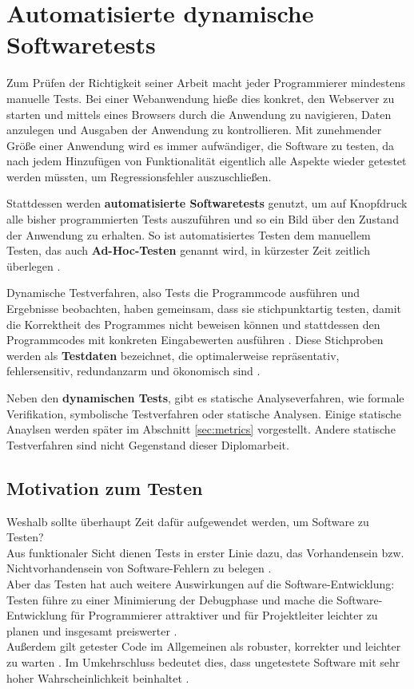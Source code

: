 \chapter{Automatisierte dynamische Softwaretests}
\label{sec:test}
Zum Prüfen der Richtigkeit seiner Arbeit macht jeder Programmierer mindestens manuelle Tests. Bei einer Webanwendung hieße dies konkret, den Webserver zu starten und mittels eines Browsers durch die Anwendung zu navigieren, Daten anzulegen und Ausgaben der Anwendung zu kontrollieren. Mit zunehmender Größe einer Anwendung wird es immer aufwändiger, die Software zu testen, da nach jedem Hinzufügen von Funktionalität eigentlich alle Aspekte wieder getestet werden müssten, um Regressionsfehler auszuschließen.

Stattdessen werden \textbf{automatisierte Softwaretests} genutzt, um auf Knopfdruck alle bisher programmierten Tests auszuführen und so ein Bild über den Zustand der Anwendung zu erhalten. So ist automatisiertes Testen dem manuellem Testen, das auch \textbf{Ad-Hoc-Testen} genannt wird, in kürzester Zeit zeitlich überlegen \citep{rappin_rails_2011}.

Dynamische Testverfahren, also Tests die Programmcode ausführen und Ergebnisse beobachten, haben gemeinsam, dass sie stichpunktartig testen, damit die Korrektheit des Programmes nicht beweisen können und stattdessen den Programmcodes mit konkreten Eingabewerten ausführen \citep[S. 49]{liggesmeyer_modultest_1990}. Diese Stichproben werden als \textbf{Testdaten} bezeichnet, die optimalerweise repräsentativ, fehlersensitiv, redundanzarm und ökonomisch sind \citep[S. 51]{liggesmeyer_modultest_1990}.

Neben den \textbf{dynamischen Tests}, gibt es statische Analyseverfahren, wie formale Verifikation, symbolische Testverfahren oder statische Analysen. Einige statische Anaylsen werden später im Abschnitt \ref{sec:metrics} vorgestellt. Andere statische Testverfahren sind nicht Gegenstand dieser Diplomarbeit.

\section{Motivation zum Testen}
Weshalb sollte überhaupt Zeit dafür aufgewendet werden, um Software zu Testen?\\
Aus funktionaler Sicht dienen Tests in erster Linie dazu, das Vorhandensein bzw. Nichtvorhandensein von Software-Fehlern zu belegen \citep{goodliffe_code_2006}.\\
Aber das Testen hat auch weitere Auswirkungen auf die Software-Entwicklung: Testen führe zu einer Minimierung der Debugphase und mache die Software\hyp{}Entwicklung für Programmierer attraktiver und für Projektleiter leichter zu planen \citep{orsini_rails_2007} und insgesamt preiswerter \citep[S.13]{liggesmeyer_modultest_1990}.\\
Außerdem gilt getester Code im Allgemeinen als robuster, korrekter und leichter zu warten \citep{rappin_rails_2011}. Im Umkehrschluss bedeutet dies, dass ungetestete Software mit sehr hoher Wahrscheinlichkeit  beinhaltet \citep{goodliffe_code_2006}.

